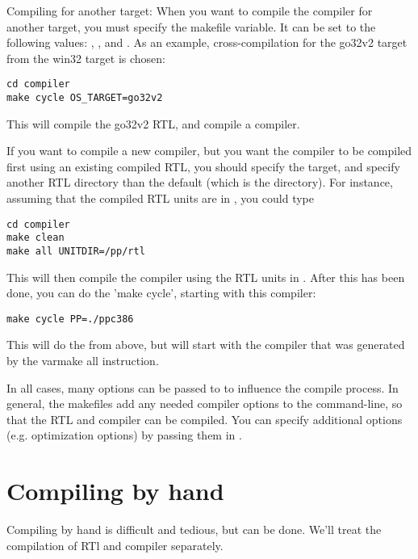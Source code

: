 \documentclass{report}
\begin{document}
Compiling for another target:
When you want to compile the compiler for another target, you must specify
the  makefile variable. It can be set to the following
values: , ,  and .
As an example, cross-compilation for the go32v2 target from the win32 target
is chosen:
\begin{verbatim}
cd compiler
make cycle OS_TARGET=go32v2
\end{verbatim}
This will compile the go32v2 RTL, and compile a  compiler.

If you want to compile a new compiler, but you want the compiler to be
compiled first using an existing compiled RTL, you should specify the 
 target, and specify another RTL directory than the default (which
is the  directory). For instance, assuming that
the compiled RTL units are in , you could type
\begin{verbatim}
cd compiler
make clean
make all UNITDIR=/pp/rtl
\end{verbatim}

This will then compile the compiler using the RTL units in .
After this has been done, you can do the 'make cycle', starting with this 
compiler:
\begin{verbatim}
make cycle PP=./ppc386
\end{verbatim}
This will do the  from above, but will start with the compiler
that was generated by the var{make all} instruction.

In all cases, many options can be passed to  to influence the
compile process. In general, the makefiles add any needed compiler options
to the command-line, so that the RTL and compiler can be compiled. You can
specify additional options (e.g. optimization options) by passing them in
.

\section{Compiling by hand}

Compiling by hand is difficult and tedious, but can be done. We'll treat the 
compilation of RTl and compiler separately.
\end{document}
